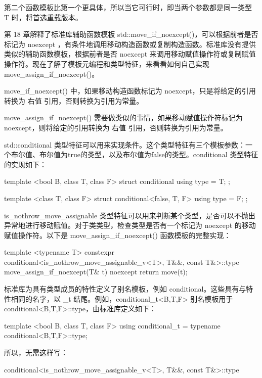 第二个函数模板比第一个更具体，所以当它可行时，即当两个参数都是同一类型 T 时，将首选重载版本。


第 18 章解释了标准库辅助函数模板 std::move\_if\_noexcept()，可以根据前者是否标记为 noexcept ，有条件地调用移动构造函数或复制构造函数。标准库没有提供类似的辅助函数模板，根据前者是否 noexcept 来调用移动赋值操作符或复制赋值操作符。现在了解了模板元编程和类型特征，来看看如何自己实现 move\_assign\_if\_noexcept()。

move\_if\_noexcept() 中，如果移动构造函数标记为 noexcept，只是将给定的引用转换为 右值 引用，否则转换为引用为常量。

move\_assign\_if\_noexcept() 需要做类似的事情，如果移动赋值操作符标记为 noexcept，则将给定的引用转换为 右值 引用，否则转换为引用为常量。

std::conditional 类型特征可以用来实现条件。这个类型特征有三个模板参数：一个布尔值、布尔值为true的类型，以及布尔值为false的类型。conditional 类型特征的实现如下：

\begin{cpp}
template <bool B, class T, class F>
struct conditional { using type = T; };

template <class T, class F>
struct conditional<false, T, F> { using type = F; };
\end{cpp}

is\_nothrow\_move\_assignable 类型特征可以用来判断某个类型，是否可以不抛出异常地进行移动赋值。对于类类型，检查类型是否有一个标记为 noexcept 的移动赋值操作符。以下是 move\_assign\_if\_noexcept() 函数模板的完整实现：

\begin{cpp}
template <typename T>
constexpr conditional<is_nothrow_move_assignable_v<T>, T&&, const T&>::type
    move_assign_if_noexcept(T& t) noexcept
{
    return move(t);
}
\end{cpp}

标准库为具有类型成员的特性定义了别名模板，例如 conditional。这些具有与特性相同的名字，以 \_t 结尾。例如，conditional\_t<B,T,F> 别名模板用于 conditional<B,T,F>::type，由标准库定义如下：

\begin{cpp}
template <bool B, class T, class F>
using conditional_t = typename conditional<B,T,F>::type;
\end{cpp}

所以，无需这样写：

\begin{cpp}
conditional<is_nothrow_move_assignable_v<T>, T&&, const T&>::type
\end{cpp}

